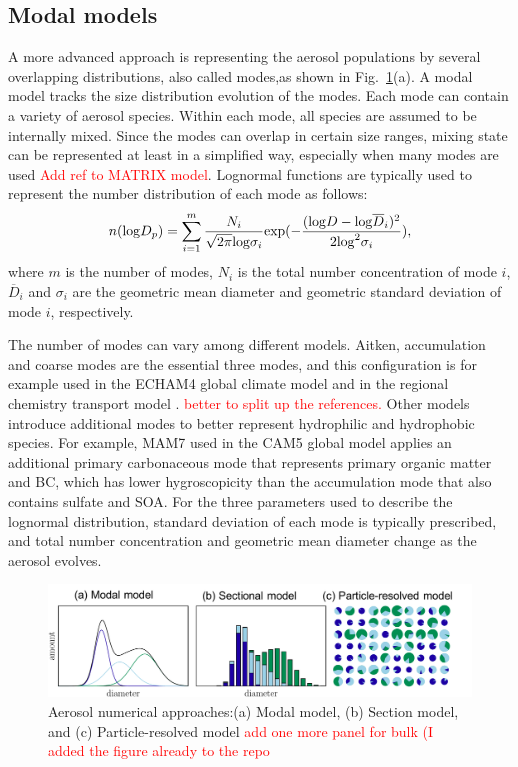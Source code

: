 \documentclass[edeposit,fullpage]{uiucthesis2009}
\begin{document}
\subsection{Modal models}
A more advanced approach is representing the aerosol populations by
several overlapping distributions, also called modes,as shown in
Fig.~\ref{fig:chap1-aerosol-model}(a). A modal model tracks the size
distribution evolution of the modes. Each mode can contain a variety
of aerosol species. Within each mode, all species are assumed to be
internally mixed. Since the modes can overlap in certain size ranges,
mixing state can be represented at least in a simplified way,
especially when many modes are used \citep{Bauer2008}
\textcolor{red}{Add ref to MATRIX model}. Lognormal functions are
typically used to represent the number distribution of each mode as
follows:
\begin{equation}
\centering
    n({\rm log}D_p) = \sum_{i=1}^{m}\frac{N_i}{\sqrt{2\pi}{\rm log}\sigma_i}{\rm exp}(-\frac{({\rm log}D-{\rm log}{\overline{D}_i})^2}{2{\rm log}^2\sigma_i}),
\end{equation}
where $m$ is the number of modes, $N_i$ is the total number
concentration of mode $i$, $\overline{D}_{i}$ and $\sigma_i$ are the
geometric mean diameter and geometric standard deviation of mode $i$,
respectively.

The number of modes can vary among different models. Aitken,
accumulation and coarse modes are the essential three modes, and this
configuration is for example used in the ECHAM4 global climate model
and in the regional chemistry transport model
\citep{lauer2005simulating,
  binkowski2003models}. \textcolor{red}{better to split up the
  references.} Other models introduce additional modes to better
represent hydrophilic and hydrophobic species. For example, MAM7 used
in the CAM5 global model applies an additional primary carbonaceous
mode that represents primary organic matter and BC, which has lower
hygroscopicity than the accumulation mode \citep{liu2012toward} that
also contains sulfate and SOA. For the three parameters used to
describe the lognormal distribution, standard deviation of each mode
is typically prescribed, and total number concentration and geometric
mean diameter change as the aerosol evolves.

\begin{figure}
	\centering
	\includegraphics[scale=0.5]{chap1_figs/thesis_chap1_fig5.pdf}
	\caption{Aerosol numerical approaches:(a) Modal model, (b)
          Section model, and (c) Particle-resolved model
          \textcolor{red}{add one more panel for bulk (I added the
            figure already to the repo}}
	\label{fig:chap1-aerosol-model}
\end{figure}
\end{document}
